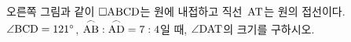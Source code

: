 \noindent\begin{minipage}[t]{0.58\linewidth}\vspace{0pt}\raggedright 오른쪽 그림과 같이 $\square\mathrm{ABCD}$는 원에 내접하고 직선~$\mathrm{AT}$는 원의 접선이다. $\angle\mathrm{BCD}=121^\circ$, $\overset{\frown}{\mathrm{AB}}:\overset{\frown}{\mathrm{AD}}=7:4$일 때, $\angle\mathrm{DAT}$의 크기를 구하시오.\end{minipage}\hfill\begin{minipage}[t]{0.4\linewidth}\vspace{0pt}\centering \resizebox{\ifdim\width>\linewidth\linewidth\else\width\fi}{!}{}\end{minipage}\par
